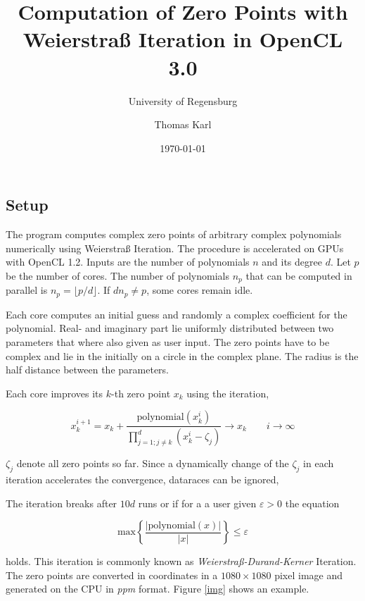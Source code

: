 \documentclass[a4paper,headsepline=3pt,headinclude=true,12pt,oneside]{scrartcl}
\author{Thomas Karl}
\title{Computation of Zero Points with Weierstraß Iteration in OpenCL 3.0}
\subtitle{University of Regensburg}
\date{\today}
\begin{document}
\begin{onehalfspace}

	\maketitle
	\thispagestyle{empty}
		
	\section{Setup}
	The program computes complex zero points of arbitrary complex polynomials numerically using Weierstraß Iteration. The procedure is accelerated on GPUs with OpenCL 1.2. Inputs are the number of polynomials $n$ and its degree $d$. Let $p$ be the number of cores. The number of polynomials $n_p$ that can be computed in parallel is $n_p=\lfloor p/d \rfloor$. If $dn_p \neq p$, some cores remain idle.
	
	Each core computes an initial guess and randomly a complex coefficient for the polynomial. Real- and imaginary part lie uniformly distributed between two parameters that where also given as user input. The zero points have to be complex and lie in the initially on a circle in the complex plane. The radius is the half distance between the parameters.
	
	Each core improves its $k$-th zero point $x_k$ using the iteration, 
	
	\begin{equation}
		x_k^{i+1} = x_k + \frac{\text{polynomial}(x_k^i)}{\prod_{j=1;j\neq k}^{d}(x_k^i-\zeta_j)} \longrightarrow x_k \qquad i \rightarrow \infty
	\end{equation}

	$\zeta_j$ denote all zero points so far. Since a dynamically change of the $\zeta_j$ in each iteration accelerates the convergence, dataraces can be ignored,
	
	The iteration breaks after $10d$ runs or if for a a user given $\varepsilon > 0$ the equation	
	
	\begin{equation}
		\text{max}\left\{ \frac{|\text{polynomial}(x)|}{|x|} \right\} \leq \varepsilon
	\end{equation}
	
	holds. This iteration is commonly known as \textit{Weierstraß-Durand-Kerner} Iteration. The zero points are converted in coordinates in a $1080\times 1080$ pixel image and generated on the CPU in \textit{ppm} format. Figure \ref{img} shows an example.


\end{onehalfspace}
\end{document}

